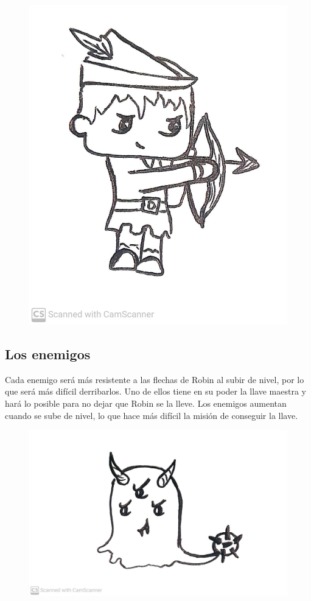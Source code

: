 \documentclass{article}
\begin{document}
\begin{figure}[h!]
    \centering
    \includegraphics[scale=0.3]{WhatsApp Image 2021-09-14 at 12.01.50 PM.jpeg}
\end{figure}

\newpage


\subsection{Los enemigos}
Cada enemigo será más resistente a las flechas de Robin al subir de nivel, por lo que será más difícil derribarlos. Uno de ellos tiene en su poder la llave maestra y hará lo posible para no dejar que Robin se la lleve. Los enemigos aumentan cuando se sube de nivel, lo que hace más difícil la misión de conseguir la llave.

\begin{figure}[h!]
    \centering
    \includegraphics[scale=0.3]{WhatsApp Image 2021-09-14 at 12.02.08 PM.jpeg}
\end{figure}
\end{document}
